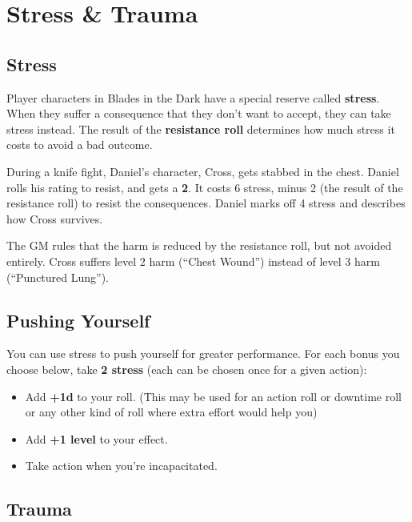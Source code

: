 \section{Stress \& Trauma}

\subsection{Stress}

Player characters in Blades in the Dark have a special reserve called \textbf{stress}. When they suffer a consequence that they don’t want to accept, they can take stress instead. The result of the \textbf{resistance roll} determines how much stress it costs to avoid a bad outcome.

\begin{qb}During a knife fight, Daniel’s character, Cross, gets stabbed in the chest. Daniel rolls his  rating to resist, and gets a \textbf{2}. It costs 6 stress, minus 2 (the result of the resistance roll) to resist the consequences. Daniel marks off 4 stress and describes how Cross survives.\end{qb}

    The GM rules that the harm is reduced by the resistance roll, but not avoided entirely. Cross suffers level 2 harm (``Chest Wound'') instead of level 3 harm (``Punctured Lung'').

\subsection{Pushing Yourself}

You can use stress to push yourself for greater performance. For each bonus you choose below, take \textbf{2 stress} (each can be chosen once for a given action):

\begin{itemize}
\item Add \textbf{+1d} to your roll. (This may be used for an action roll or downtime roll or any other kind of roll where extra effort would help you)
\item Add \textbf{+1 level} to your effect.
\item Take action when you’re incapacitated.
\end{itemize}

\subsection{Trauma}

